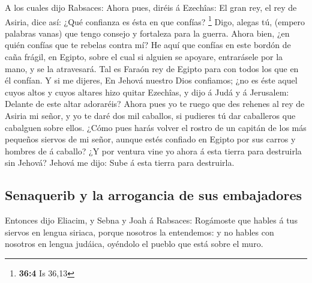  A los cuales dijo Rabsaces: Ahora pues, diréis á
Ezechîas: El gran rey, el rey de Asiria, dice así: ¿Qué confianza es
ésta en que confías? \footnote{\textbf{36:4} Is 36,13} 
Digo, alegas tú, (empero palabras vanas) que tengo consejo y fortaleza
para la guerra. Ahora bien, ¿en quién confías que te rebelas contra mí?
 He aquí que confías en este bordón de caña frágil, en
Egipto, sobre el cual si alguien se apoyare, entrarásele por la mano, y
se la atravesará. Tal es Faraón rey de Egipto para con todos los que en
él confían.  Y si me dijeres, En Jehová nuestro Dios
confiamos; ¿no es éste aquel cuyos altos y cuyos altares hizo quitar
Ezechîas, y dijo á Judá y á Jerusalem: Delante de este altar adoraréis?
 Ahora pues yo te ruego que des rehenes al rey de Asiria
mi señor, y yo te daré dos mil caballos, si pudieres tú dar caballeros
que cabalguen sobre ellos.  ¿Cómo pues harás volver el
rostro de un capitán de los más pequeños siervos de mi señor, aunque
estés confiado en Egipto por sus carros y hombres de á caballo?
 ¿Y por ventura vine yo ahora á esta tierra para
destruirla sin Jehová? Jehová me dijo: Sube á esta tierra para
destruirla.

\hypertarget{senaquerib-y-la-arrogancia-de-sus-embajadores}{%
\subsection{Senaquerib y la arrogancia de sus
embajadores}\label{senaquerib-y-la-arrogancia-de-sus-embajadores}}

 Entonces dijo Eliacim, y Sebna y Joah á Rabsaces:
Rogámoste que hables á tus siervos en lengua siriaca, porque nosotros la
entendemos: y no hables con nosotros en lengua judáica, oyéndolo el
pueblo que está sobre el muro.

